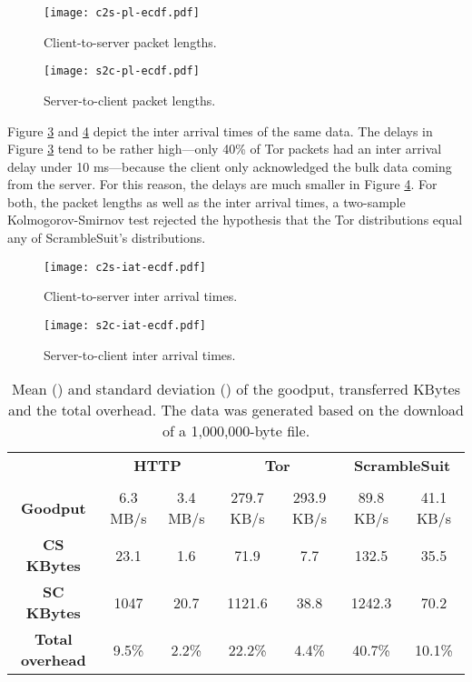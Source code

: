 \documentclass{sig-alternate}
\newcommand{\pt}{\textsf{ScrambleSuit}}
\numberwithin{enumi}{section}
\numberwithin{notesctr}{section}
\begin{document}
{\begin{figure}[t]
\centering
\texttt{[image: c2s-pl-ecdf.pdf]}
\caption{Client-to-server packet lengths.}
\label{fig:c2spl}
\end{figure}

\begin{figure}[t]
\centering
\texttt{[image: s2c-pl-ecdf.pdf]}
\caption{Server-to-client packet lengths.}
\label{fig:s2cpl}
\end{figure}

Figure \ref{fig:c2siat} and \ref{fig:s2ciat} depict the inter arrival times of the same data. The
delays in Figure \ref{fig:c2siat} tend to be rather high---only 40\% of Tor packets had an inter
arrival delay under 10 ms---because the client only acknowledged the bulk data coming from the
server. For this reason, the delays are much smaller in Figure \ref{fig:s2ciat}. For both, the
packet lengths as well as the inter arrival times, a two-sample Kolmogorov-Smirnov test rejected the
hypothesis that the Tor distributions equal any of \pt{}'s distributions.

\begin{figure}[t]
\centering
\texttt{[image: c2s-iat-ecdf.pdf]}
\caption{Client-to-server inter arrival times.}
\label{fig:c2siat}
\end{figure}

\begin{figure}[t]
\centering
\texttt{[image: s2c-iat-ecdf.pdf]}
\caption{Server-to-client inter arrival times.}
\label{fig:s2ciat}
\end{figure}

\begin{table*}[t]
\caption{Mean () and standard deviation () of the goodput, transferred KBytes and the
total overhead. The data was generated based on the download of a 1,000,000-byte file.}
\label{table:performance}
\begin{center}
\begin{tabular}{|c|c|c|c|c|c|c|}
\hline
& \multicolumn{2}{|c|}{\textbf{HTTP}} & \multicolumn{2}{|c|}{\textbf{Tor}} &
	\multicolumn{2}{|c|}{\textbf{\pt{}}} \\
& \multicolumn{2}{|c|}{} &
   \multicolumn{2}{|c|}{} &
   \multicolumn{2}{|c|}{} \\

\hline
\textbf{Goodput} & 6.3 MB/s & 3.4 MB/s & 279.7 KB/s & 293.9 KB/s & 89.8 KB/s & 41.1 KB/s \\
\hline
\textbf{CS KBytes} & 23.1 & 1.6 & 71.9 & 7.7 & 132.5 & 35.5 \\
\hline
\textbf{SC KBytes} & 1047 & 20.7 & 1121.6 & 38.8 & 1242.3 & 70.2 \\
\hline
\textbf{Total overhead} & 9.5\% & 2.2\% & 22.2\% & 4.4\% & 40.7\% & 10.1\% \\
\hline
\end{tabular}
\end{center}
\end{table*}

}
\end{document}
